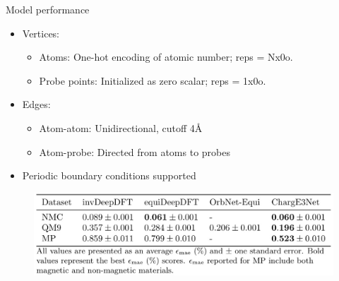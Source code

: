 \begin{frame}{Model performance}
    \begin{itemize}
        \item Vertices:
        \begin{itemize}
            \item Atoms: One-hot encoding of atomic number; reps = Nx0o.
            \item Probe points: Initialized as zero scalar; reps = 1x0o.
        \end{itemize}
        \item Edges:
        \begin{itemize}
            \item Atom-atom: Unidirectional, cutoff 4Å
            \item Atom-probe: Directed from atoms to probes
        \end{itemize}
        \item Periodic boundary conditions supported
    \end{itemize}
    \begin{figure}
        \includegraphics[width=\textwidth]{figures/charge3net_1.jpg}
    \end{figure}
\end{frame}



